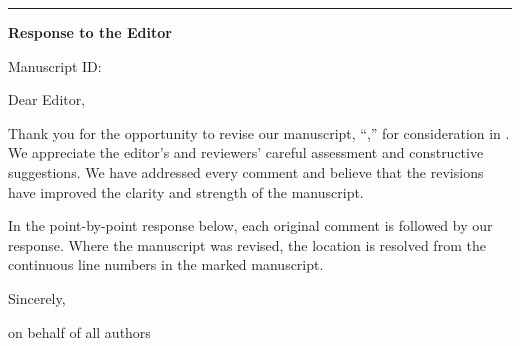 \documentclass[11pt]{article}
\newcommand{\ManuscriptIDLine}{%
  \if\relax\detokenize\expandafter{\ManuscriptID}\relax
  \else Manuscript ID: \ManuscriptID\fi}
\begin{document}
{\color{navy}\rule{\textwidth}{1.5pt}}\par
\vspace{0.15in}
{\sffamily\bfseries\LARGE Response to the Editor}\par
\vspace{0.08in}
{\color{graytext}\ManuscriptTitle}\par
{\small\color{graytext}\JournalName\quad\ManuscriptIDLine}
\vspace{0.28in}

Dear Editor,

Thank you for the opportunity to revise our manuscript, ``\ManuscriptTitle,''
for consideration in \textit{\JournalName}. We appreciate the editor's and
reviewers' careful assessment and constructive suggestions. We have addressed
every comment and believe that the revisions have improved the clarity and
strength of the manuscript.

In the point-by-point response below, each original comment is followed by our
response. Where the manuscript was revised, the location is resolved from the
continuous line numbers in the marked manuscript.

Sincerely,\par
\vspace{0.25in}
\CorrespondenceAuthorName\par
on behalf of all authors\par
\href{mailto:\CorrespondenceAuthorEmail}{\CorrespondenceAuthorEmail}

\end{document}
